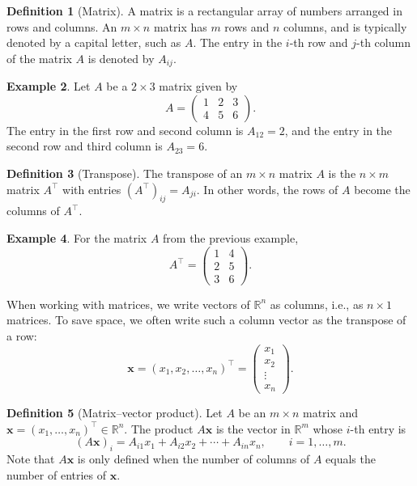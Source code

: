 \documentclass[11pt]{article}
\theoremstyle{definition}
\newtheorem{definition}{Definition}[section]
\newtheorem{example}[definition]{Example}
\theoremstyle{plain}
\theoremstyle{remark}
\begin{document}
\begin{definition}[Matrix]
    A matrix is a rectangular array of numbers arranged in rows and columns. An $m \times n$ matrix has $m$ rows and $n$ columns, and is typically denoted by a capital letter, such as $A$. The entry in the $i$-th row and $j$-th column of the matrix $A$ is denoted by $A_{ij}$.
\end{definition}

\begin{example}
    Let $A$ be a $2 \times 3$ matrix given by
    \[A = \begin{pmatrix}
        1 & 2 & 3 \\
        4 & 5 & 6
    \end{pmatrix}.\]
    The entry in the first row and second column is $A_{12} = 2$, and the entry in the second row and third column is $A_{23} = 6$.
\end{example}

\begin{definition}[Transpose]
    The transpose of an $m \times n$ matrix $A$ is the $n \times m$ matrix $A^\top$ with entries $(A^\top)_{ij} = A_{ji}$. In other words, the rows of $A$ become the columns of $A^\top$.
\end{definition}

\begin{example}
    For the matrix $A$ from the previous example,
    \[A^\top = \begin{pmatrix}
        1 & 4 \\
        2 & 5 \\
        3 & 6
    \end{pmatrix}.\]
\end{example}

When working with matrices, we write vectors of $\mathbb{R}^n$ as columns, i.e., as $n \times 1$ matrices. To save space, we often write such a column vector as the transpose of a row:
\[\mathbf{x} = (x_1, x_2, \ldots, x_n)^\top = \begin{pmatrix}
    x_1 \\
    x_2 \\
    \vdots \\
    x_n
\end{pmatrix}.\]

\begin{definition}[Matrix--vector product]
    Let $A$ be an $m \times n$ matrix and $\mathbf{x} = (x_1, \ldots, x_n)^\top \in \mathbb{R}^n$. The product $A\mathbf{x}$ is the vector in $\mathbb{R}^m$ whose $i$-th entry is
    \[(A\mathbf{x})_i = A_{i1} x_1 + A_{i2} x_2 + \cdots + A_{in} x_n, \qquad i = 1, \ldots, m.\]
    Note that $A\mathbf{x}$ is only defined when the number of columns of $A$ equals the number of entries of $\mathbf{x}$.
\end{definition}
\end{document}
